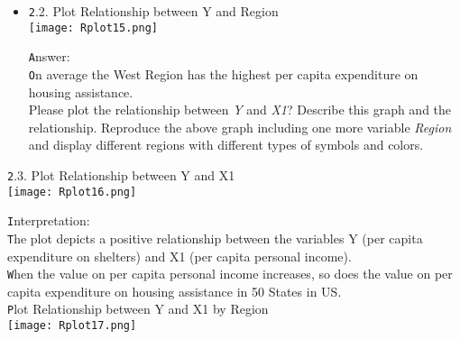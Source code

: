\documentclass[12pt,letterpaper]{article}
\begin{document}
\begin{itemize}
	\texttt Plot 6 relationship X2, X3
	
	
		\texttt{[image: Rplot14.png]}
		
	\texttt  Interpretation:\\
	\texttt Plot 6 displays a upward trend. This indicates a positive linear correlation\\ 
	\texttt  between X2 (Residents per 100,000 that are financially insecure) and X3 (People per thousand residing in urban areas)\\ 
	\texttt in 50 states in US. The slope indicates a positive relationship between X2 and X3.\\ 
	\texttt However, the relationship is weak and the observations are spread.\\

Please plot the relationship between \emph{Y} and \emph{Region}? On average, which region has the highest per capita expenditure on housing assistance?
\vspace{.5cm}
\item

	\texttt 2.2. Plot Relationship between Y and Region\\
	

	\texttt{[image: Rplot15.png]}
	
	\texttt Answer:\\
	\texttt On average the West Region has the highest per capita expenditure on housing assistance.\\ 

Please plot the relationship between \emph{Y} and \emph{X1}? Describe this graph and the relationship. Reproduce the above graph including one more variable \emph{Region} and display different regions with different types of symbols and colors.
\end{itemize}

	\texttt 2.3. Plot Relationship between Y and X1\\
	
	
		\texttt{[image: Rplot16.png]}
		
	\texttt  Interpretation:\\
	\texttt The plot depicts a positive relationship between the variables Y (per capita expenditure on shelters) and X1 (per capita personal income).\\
	\texttt When the value on per capita personal income increases, so does the value on per capita expenditure on housing assistance in 50 States in US.\\  
	
	\texttt Plot Relationship between Y and X1 by Region\\
		
	
		\texttt{[image: Rplot17.png]}
\end{document}
